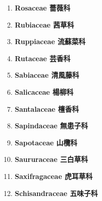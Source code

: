 \begin{enumerate}
        
      \item[] \begin{small}\textbf{Rosaceae 薔薇科} \end{small}
        
      \item[] \begin{small}\textbf{Rubiaceae 茜草科} \end{small}
        
      \item[] \begin{small}\textbf{Ruppiaceae 流蘇菜科} \end{small}
        
      \item[] \begin{small}\textbf{Rutaceae 芸香科} \end{small}
        
      \item[] \begin{small}\textbf{Sabiaceae 清風藤科} \end{small}
        
      \item[] \begin{small}\textbf{Salicaceae 楊柳科} \end{small}
        
      \item[] \begin{small}\textbf{Santalaceae 檀香科} \end{small}
        
      \item[] \begin{small}\textbf{Sapindaceae 無患子科} \end{small}
        
      \item[] \begin{small}\textbf{Sapotaceae 山欖科} \end{small}
        
      \item[] \begin{small}\textbf{Saururaceae 三白草科} \end{small}
        
      \item[] \begin{small}\textbf{Saxifragaceae 虎耳草科} \end{small}
        
      \item[] \begin{small}\textbf{Schisandraceae 五味子科} \end{small}

\end{enumerate}
